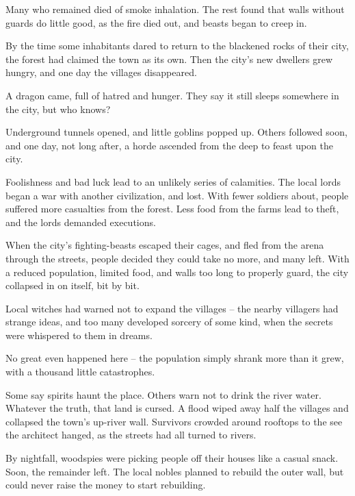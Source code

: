 \begin{multicols}{2}
\begin{dlist}
  Many who remained died of smoke inhalation.
  The rest found that walls without guards do little good, as the fire died out, and beasts began to creep in.

  By the time some inhabitants dared to return to the blackened rocks of their city, the forest had claimed the town as its own.
  Then the city's new dwellers grew hungry, and one day the villages disappeared.
  \item
  A dragon came, full of hatred and hunger.
  They say it still sleeps somewhere in the city, but who knows?
  \item
  Underground tunnels opened, and little goblins popped up.
  Others followed soon, and one day, not long after, a horde ascended from the \gls{deep} to feast upon the city.
  \item
  Foolishness and bad luck lead to an unlikely series of calamities.
  The local lords began a war with another civilization, and lost.
  With fewer soldiers about, people suffered more casualties from the forest.
  Less food from the farms lead to theft, and the lords demanded executions.

  When the city's fighting-beasts escaped their cages, and fled from the arena through the streets, people decided they could take no more, and many left.
  With a reduced population, limited food, and walls too long to properly guard, the city collapsed in on itself, bit by bit.
  \item
  \ifodd\value{r4}
    Local witches had warned not to expand the villages -- the nearby villagers had strange ideas, and too many developed sorcery of some kind, when the secrets were whispered to them in dreams.

    No great even happened here -- the population simply shrank more than it grew, with a thousand little catastrophes.

    Some say spirits haunt the place.
    Others warn not to drink the river water.
    Whatever the truth, that land is cursed.
  \else
    A flood wiped away half the villages and collapsed the town's up-river wall.
    Survivors crowded around rooftops to the see the architect hanged, as the streets had all turned to rivers.

    By nightfall, woodspies were picking people off their houses like a casual snack.
    Soon, the remainder left.
    The local nobles planned to rebuild the outer wall, but could never raise the money to start rebuilding.
  \fi
\end{dlist}


\end{multicols}
